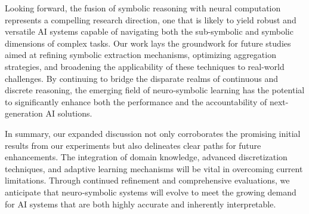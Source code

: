 \documentclass{article}
\begin{document}
Looking forward, the fusion of symbolic reasoning with neural computation represents a compelling research direction, one that is likely to yield robust and versatile AI systems capable of navigating both the sub-symbolic and symbolic dimensions of complex tasks. Our work lays the groundwork for future studies aimed at refining symbolic extraction mechanisms, optimizing aggregation strategies, and broadening the applicability of these techniques to real-world challenges. By continuing to bridge the disparate realms of continuous and discrete reasoning, the emerging field of neuro‐symbolic learning has the potential to significantly enhance both the performance and the accountability of next-generation AI solutions.

In summary, our expanded discussion not only corroborates the promising initial results from our experiments but also delineates clear paths for future enhancements. The integration of domain knowledge, advanced discretization techniques, and adaptive learning mechanisms will be vital in overcoming current limitations. Through continued refinement and comprehensive evaluations, we anticipate that neuro‐symbolic systems will evolve to meet the growing demand for AI systems that are both highly accurate and inherently interpretable.
\end{document}
